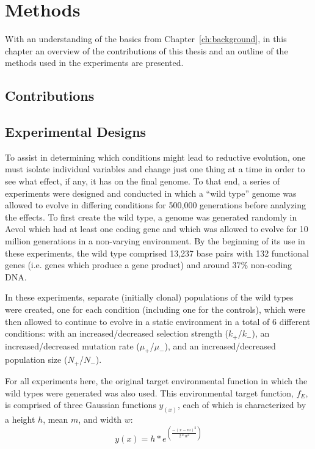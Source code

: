 \chapter{Methods}\label{ch:methods}
With an understanding of the basics from Chapter~\ref{ch:background}, in this chapter an overview of the contributions of this thesis and an outline of the methods used in the experiments are presented. 
\section{Contributions}

\section{Experimental Designs} \label{experimental_design}
To assist in determining which conditions might lead to reductive evolution, one must isolate individual variables and change just one thing at a time in order to see what effect, if any, it has on the final genome. To that end, a series of experiments were designed and conducted in which a ``wild type'' genome was allowed to evolve in differing conditions for 500,000 generations before analyzing the effects. To first create the wild type, a genome was generated randomly in Aevol which had at least one coding gene and which was allowed to evolve for 10 million generations in a non-varying environment. By the beginning of its use in these experiments, the wild type comprised 13,237 base pairs with 132 functional genes (i.e. genes which produce a gene product) and around 37\% non-coding DNA. 

In these experiments, separate (initially clonal) populations of the wild types were created, one for each condition (including one for the controls), which were then allowed to continue to evolve in a static environment in a total of 6 different conditions: with an increased/decreased selection strength ($k_+$/$k_-$), an increased/decreased mutation rate ($\mu_+$/$\mu_-$), and an increased/decreased population size ($N_+$/$N_-$). 

For all experiments here, the original target environmental function in which the wild types were generated was also used. This environmental target function, $f_E$, is comprised of three Gaussian functions $y_(x)$, each of which is characterized by a height $h$, mean $m$, and width $w$:
\begin{equation*}
y(x) = h * e^{\left(\frac{-(x-m)^2}{2 * w^2} \right)}
\end{equation*}

